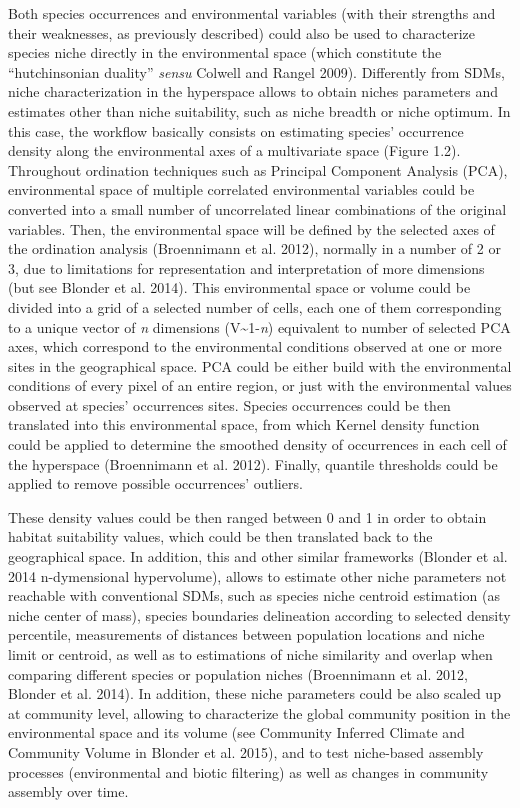 \documentclass[11pt,twoside]{reedthesis}
\begin{document}
Both species occurrences and environmental variables (with their
strengths and their weaknesses, as previously described) could also be
used to characterize species niche directly in the environmental space
(which constitute the ``hutchinsonian duality'' \emph{sensu} Colwell and
Rangel 2009). Differently from SDMs, niche characterization in the
hyperspace allows to obtain niches parameters and estimates other than
niche suitability, such as niche breadth or niche optimum. In this case,
the workflow basically consists on estimating species' occurrence
density along the environmental axes of a multivariate space (Figure
1.2). Throughout ordination techniques such as Principal Component
Analysis (PCA), environmental space of multiple correlated environmental
variables could be converted into a small number of uncorrelated linear
combinations of the original variables. Then, the environmental space
will be defined by the selected axes of the ordination analysis
(Broennimann et al. 2012), normally in a number of 2 or 3, due to
limitations for representation and interpretation of more dimensions
(but see Blonder et al. 2014). This environmental space or volume could
be divided into a grid of a selected number of cells, each one of them
corresponding to a unique vector of \emph{n} dimensions
(V\textasciitilde{}1-\emph{n}) equivalent to number of selected PCA
axes, which correspond to the environmental conditions observed at one
or more sites in the geographical space. PCA could be either build with
the environmental conditions of every pixel of an entire region, or just
with the environmental values observed at species' occurrences sites.
Species occurrences could be then translated into this environmental
space, from which Kernel density function could be applied to determine
the smoothed density of occurrences in each cell of the hyperspace
(Broennimann et al. 2012). Finally, quantile thresholds could be applied
to remove possible occurrences' outliers.\par

These density values could be then ranged between 0 and 1 in order to
obtain habitat suitability values, which could be then translated back
to the geographical space. In addition, this and other similar
frameworks (Blonder et al. 2014 n-dymensional hypervolume), allows to
estimate other niche parameters not reachable with conventional SDMs,
such as species niche centroid estimation (as niche center of mass),
species boundaries delineation according to selected density percentile,
measurements of distances between population locations and niche limit
or centroid, as well as to estimations of niche similarity and overlap
when comparing different species or population niches (Broennimann et
al. 2012, Blonder et al. 2014). In addition, these niche parameters
could be also scaled up at community level, allowing to characterize the
global community position in the environmental space and its volume (see
Community Inferred Climate and Community Volume in Blonder et al. 2015),
and to test niche-based assembly processes (environmental and biotic
filtering) as well as changes in community assembly over time.\par
\end{document}
